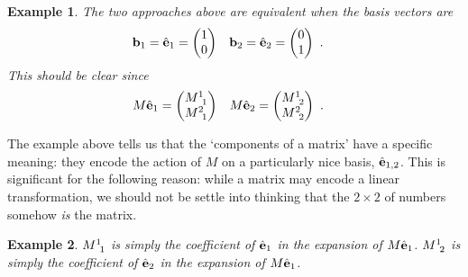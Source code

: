 \documentclass[12pt]{article}
\newtheorem{example}{Example}[section]
\begin{document}
\begin{example}
The two approaches above are equivalent when the basis vectors are
\begin{align}
    \mathbf{b}_1 = {\hat{\mathbf{e}}}_1 &= \begin{pmatrix}
        1 \\ 0
    \end{pmatrix}
    &
    \mathbf{b}_2 = {\hat{\mathbf{e}}}_2 &= \begin{pmatrix}
        0 \\ 1
    \end{pmatrix}\ .
\end{align}
This should be clear since
\begin{align}
    M {\bas{e}}_1 &= 
    \begin{pmatrix}
        M\aij{1}{1} \\ M\aij{2}{1}
    \end{pmatrix}
    &
    M {\bas{e}}_2 &= 
    \begin{pmatrix}
        M\aij{1}{2} \\ M\aij{2}{2}
    \end{pmatrix} \ .
    \label{vec:Mhate:2}
\end{align}
\end{example}
The example above tells us that the `components of a matrix' have a specific meaning: they encode the action of $M$ on a particularly nice basis, ${\hat{\mathbf{e}}}_{1,2}$. This is significant for the following reason: while a matrix may encode a linear transformation, we should not be settle into thinking that the $2\times 2$ of numbers somehow \emph{is} the matrix.
\begin{example}
$M\aij 11$ is simply the coefficient of ${\hat{\mathbf{e}}}_1$ in the expansion of $M{\hat{\mathbf{e}}}_1$. $M\aij 12$ is simply the coefficient of ${\hat{\mathbf{e}}}_2$ in the expansion of $M{\hat{\mathbf{e}}}_1$. 
\end{example}



 
\end{document}
